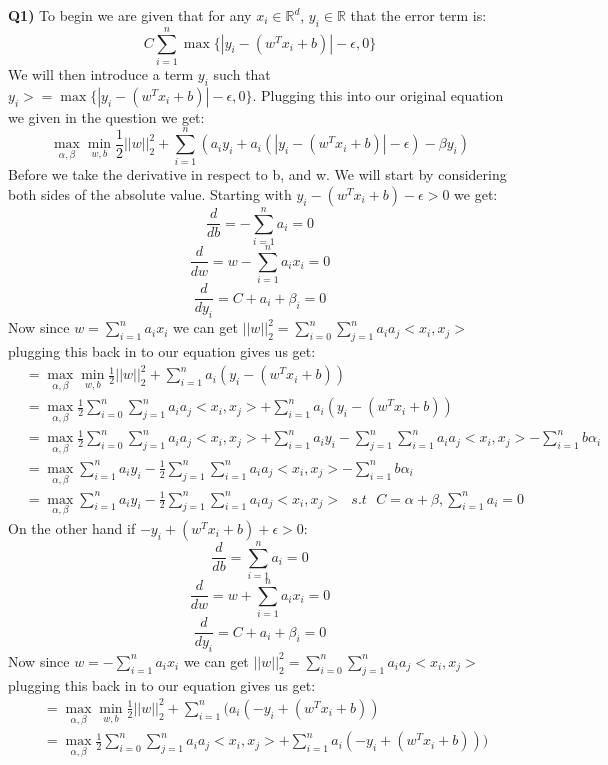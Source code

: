 \documentclass{article}
\begin{document}
\begin{titlepage}
\vspace{0.5cm}
\textbf{Q1)} To begin we are given that for any $x_i \in \mathbb{R}^d$, $y_i \in \mathbb{R}$ that the error term is:
\[ C \sum^n_{i=1} \max\{|y_i-(w^Tx_i+b)|-\epsilon, 0 \} \]
We will then introduce a term $y_i$ such that $y_i >= \max\{|y_i-(w^Tx_i+b)|-\epsilon, 0 \}$. Plugging this into our original equation we given in the question we get:
\[ \max_{\alpha, \beta} \min_{w,b}\frac{1}{2}||w||^2_2 + \sum^n_{i=1} (a_iy_i + a_i(|y_i-(w^Tx_i+b)|-\epsilon)-\beta y_i) \]
Before we take the derivative in respect to b, and w. We will start by considering both sides of the absolute value. Starting with $y_i-(w^Tx_i+b)-\epsilon > 0$ we get:
\[ \frac{d}{db} = - \sum_{i=1}^na_i = 0 \]
\[ \frac{d}{dw} = w - \sum_{i=1}^na_ix_i = 0 \]
\[ \frac{d}{dy_i} = C + a_i + \beta_i = 0 \]
Now since $w = \sum_{i=1}^na_ix_i$ we can get $||w||^2_2 = \sum^n_{i=0}\sum^n_{j=1}a_ia_j<x_i, x_j>$ plugging this back in to our equation gives us get: \\
\begin{align*}
&= \max_{\alpha, \beta} \min_{w,b}\frac{1}{2}||w||^2_2 + \sum^n_{i=1} a_i(y_i-(w^Tx_i+b))\\
&= \max_{\alpha, \beta} \frac{1}{2}\sum^n_{i=0}\sum^n_{j=1}a_ia_j<x_i, x_j> + \sum^n_{i=1} a_i(y_i-(w^Tx_i+b)) \\
&= \max_{\alpha, \beta} \frac{1}{2}\sum^n_{i=0}\sum^n_{j=1}a_ia_j<x_i, x_j> + \sum^n_{i=1}a_iy_i - \sum^n_{j=1}\sum^n_{i=1}a_ia_j<x_i, x_j>- \sum^n_{i=1}b\alpha_i \\
&= \max_{\alpha, \beta} \sum^n_{i=1}a_iy_i -\frac{1}{2} \sum^n_{j=1}\sum^n_{i=1}a_ia_j<x_i, x_j>- \sum^n_{i=1}b\alpha_i \\
&= \max_{\alpha, \beta} \sum^n_{i=1}a_iy_i -\frac{1}{2} \sum^n_{j=1}\sum^n_{i=1}a_ia_j<x_i, x_j> \text{  } s.t \text{  } C = \alpha + \beta, \sum_{i=1}^na_i = 0
\end{align*}
\newpage
On the other hand if $-y_i+(w^Tx_i+b)+\epsilon > 0$:
\[ \frac{d}{db} = \sum_{i=1}^na_i = 0 \]
\[ \frac{d}{dw} = w + \sum_{i=1}^na_ix_i = 0 \]
\[ \frac{d}{dy_i} = C + a_i + \beta_i = 0 \]
Now since $w = -\sum_{i=1}^na_ix_i$ we can get $||w||^2_2 = \sum^n_{i=0}\sum^n_{j=1}a_ia_j<x_i, x_j>$ plugging this back in to our equation gives us get: \\
\begin{align*}
&= \max_{\alpha, \beta} \min_{w,b}\frac{1}{2}||w||^2_2 + \sum^n_{i=1} (a_i(-y_i+(w^Tx_i+b))\\
&= \max_{\alpha, \beta} \frac{1}{2}\sum^n_{i=0}\sum^n_{j=1}a_ia_j<x_i, x_j> + \sum^n_{i=1} a_i(-y_i+(w^Tx_i+b))) \\

\end{align*}
\end{titlepage}
\end{document}
